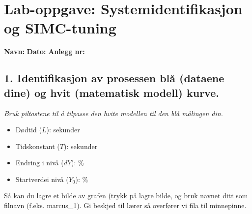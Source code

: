 \documentclass[a4paper,11pt]{article}
\begin{document}
\section*{Lab-oppgave: Systemidentifikasjon og SIMC-tuning}

\textbf{Navn:} \underline{\hspace{5cm}} \textbf{Dato:} \underline{\hspace{3cm}} \textbf{Anlegg nr:} \underline{\hspace{1cm}}

\subsection*{1. Identifikasjon av prosessen blå (dataene dine) og hvit (matematisk modell) kurve.}
\textit{Bruk piltastene til å tilpasse den hvite modellen til den blå målingen din.}
\begin{itemize}
 \item Dødtid ($L$): \underline{\hspace{2cm}} sekunder
 \item Tidskonstant ($T$): \underline{\hspace{2cm}} sekunder
    \item Endring i nivå ($dY$): \underline{\hspace{2cm}}\% 
    \item Startverdei nivå ($Y_0$): \underline{\hspace{2cm}}\%
\end{itemize}
Så kan du lagre et bilde av grafen (trykk på lagre bilde, og bruk navnet ditt som filnavn (f.eks. marcus\_1).  Gi beskjed til lærer så overfører vi fila til minnepinne.
\end{document}

